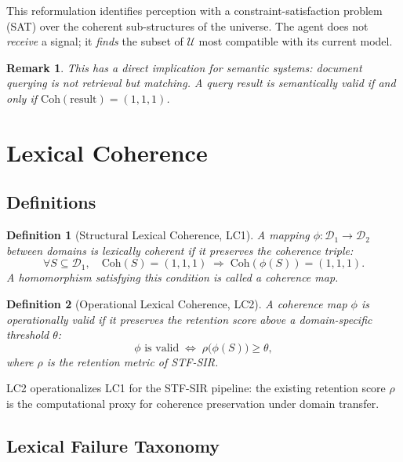 \documentclass{article}
\newcommand{\STF}{{\normalfont\textsc{STF}}}
\newcommand{\SIR}{{\normalfont\textsc{SIR}}}
\newcommand{\Univ}{\mathcal{U}}
\newcommand{\CohTriple}{\mathrm{Coh}}
\newtheorem{definition}{Definition}
\newtheorem{remark}{Remark}
\begin{document}
This reformulation identifies perception with a constraint-satisfaction problem
(SAT) over the coherent sub-structures of the universe.  The agent does not
\emph{receive} a signal; it \emph{finds} the subset of $\Univ$ most compatible
with its current model.

\begin{remark}
This has a direct implication for semantic systems: document querying is not
retrieval but matching.  A query result is semantically valid if and only if
$\CohTriple(\text{result}) = (1,1,1)$.
\end{remark}

\section{Lexical Coherence}
\label{sec:lexical}

\subsection{Definitions}

\begin{definition}[Structural Lexical Coherence, LC1]
A mapping $\phi : \mathcal{D}_1 \to \mathcal{D}_2$ between domains is
\emph{lexically coherent} if it preserves the coherence triple:
\[
  \forall S \subseteq \mathcal{D}_1,\quad
  \CohTriple(S) = (1,1,1)
  \;\Rightarrow\;
  \CohTriple(\phi(S)) = (1,1,1).
\]
A homomorphism satisfying this condition is called a \emph{coherence map}.
\end{definition}

\begin{definition}[Operational Lexical Coherence, LC2]
A coherence map $\phi$ is \emph{operationally valid} if it preserves the
retention score above a domain-specific threshold $\theta$:
\[
  \phi \text{ is valid} \;\iff\; \rho\bigl(\phi(S)\bigr) \geq \theta,
\]
where $\rho$ is the retention metric of \STF{}-\SIR{}.
\end{definition}

LC2 operationalizes LC1 for the \STF{}-\SIR{} pipeline: the existing retention
score $\rho$ is the computational proxy for coherence preservation under
domain transfer.

\subsection{Lexical Failure Taxonomy}
\end{document}
